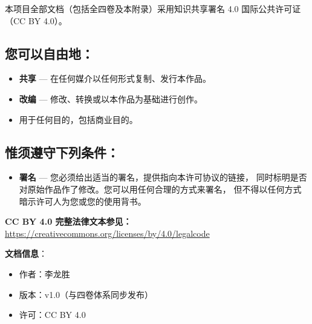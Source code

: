 \documentclass[11pt,a4paper]{article}
\begin{document}
本项目全部文档（包括全四卷及本附录）采用知识共享署名 4.0 国际公共许可证（CC BY 4.0）。

\subsection*{您可以自由地：}
\begin{itemize}
    \item \textbf{共享} — 在任何媒介以任何形式复制、发行本作品。
    \item \textbf{改编} — 修改、转换或以本作品为基础进行创作。
    \item 用于任何目的，包括商业目的。
\end{itemize}

\subsection*{惟须遵守下列条件：}
\begin{itemize}
    \item \textbf{署名} — 您必须给出适当的署名，提供指向本许可协议的链接，
          同时标明是否对原始作品作了修改。您可以用任何合理的方式来署名，
          但不得以任何方式暗示许可人为您或您的使用背书。
\end{itemize}

\textbf{CC BY 4.0 完整法律文本参见：}\\
\url{https://creativecommons.org/licenses/by/4.0/legalcode}

\vspace{5mm}
\noindent\textbf{文档信息}：
\begin{itemize}
    \item 作者：李龙胜
    \item 版本：v1.0（与四卷体系同步发布）
    \item 许可：CC BY 4.0
\end{itemize}
\end{document}

